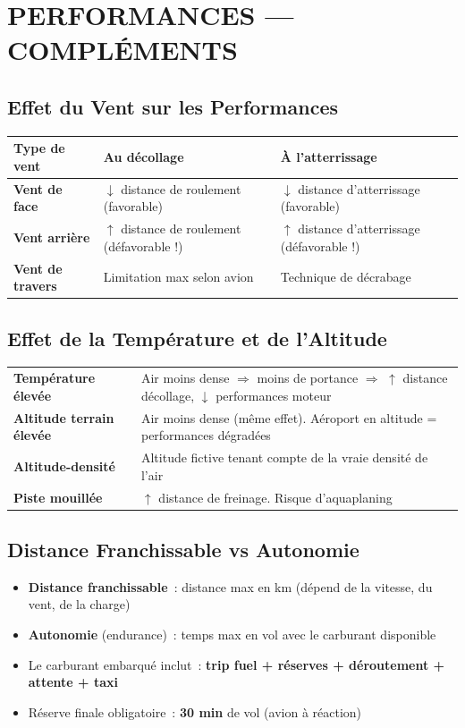 \section{PERFORMANCES --- COMPLÉMENTS}

\subsection{Effet du Vent sur les Performances}

\begin{tabular}{p{3cm}p{5.5cm}p{5.5cm}}
\toprule
\textbf{Type de vent} & \textbf{Au décollage} & \textbf{À l'atterrissage} \\
\midrule
\textbf{Vent de face} & $\downarrow$ distance de roulement (favorable) & $\downarrow$ distance d'atterrissage (favorable) \\
\rowcolor{warnred}
\textbf{Vent arrière} & $\uparrow$ distance de roulement (défavorable !) & $\uparrow$ distance d'atterrissage (défavorable !) \\
\textbf{Vent de travers} & Limitation max selon avion & Technique de décrabage \\
\bottomrule
\end{tabular}

\subsection{Effet de la Température et de l'Altitude}

\begin{tabular}{p{4cm}p{10.5cm}}
\toprule
\textbf{Température élevée} & Air moins dense $\Rightarrow$ moins de portance $\Rightarrow$ $\uparrow$ distance décollage, $\downarrow$ performances moteur \\
\textbf{Altitude terrain élevée} & Air moins dense (même effet). Aéroport en altitude = performances dégradées \\
\textbf{Altitude-densité} & Altitude fictive tenant compte de la vraie densité de l'air \\
\textbf{Piste mouillée} & $\uparrow$ distance de freinage. Risque d'aquaplaning \\
\bottomrule
\end{tabular}

\subsection{Distance Franchissable vs Autonomie}
\begin{itemize}[nosep]
\item \textbf{Distance franchissable}~: distance max en km (dépend de la vitesse, du vent, de la charge)
\item \textbf{Autonomie} (endurance)~: temps max en vol avec le carburant disponible
\item Le carburant embarqué inclut~: \textbf{trip fuel + réserves + déroutement + attente + taxi}
\item Réserve finale obligatoire~: \textbf{30 min} de vol (avion à réaction)
\end{itemize}

